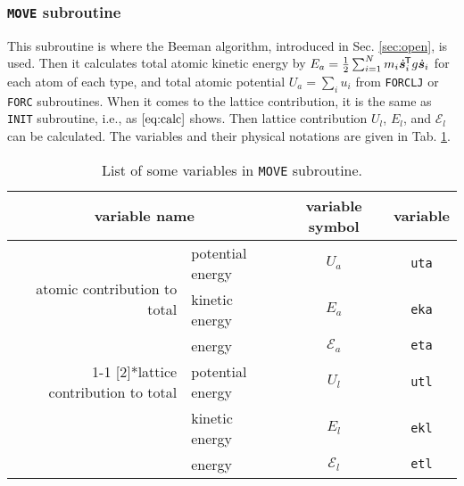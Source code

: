 
\subsubsection{\texttt{MOVE} subroutine}

This subroutine is where the Beeman algorithm, introduced in Sec. \ref{sec:open}, is used.
Then it calculates total atomic kinetic energy by
$E_a = \frac{ 1 }{ 2 } \sum_{i=1}^{N} m_i \dot{ \bm{s} }_i ^{\mkern-1.5mu\mathsf{T}}
g \dot{ \bm{s} }_i$ for each atom of each type,
and total atomic potential $U_a = \sum_{i} u_i$ from \texttt{FORCLJ} or \texttt{FORC}
subroutines.
When it comes to the lattice contribution, it is the same as \texttt{INIT} subroutine,
i.e., as $\eqref{eq:calc}$ shows. Then lattice contribution $U_l$, $E_l$, and
$\mathscr{E}_l$ can be calculated. The variables and their physical notations are given in 
Tab. \ref{tab:move}.

\begin{table}[h]
	\centering
	\caption{List of some variables in \texttt{MOVE} subroutine.}
	\begin{tabular}{@{}rlcc@{}}
		\toprule
		\multicolumn{2}{c}{variable name} & variable symbol & variable \\
		\midrule
		\multirow{3}[2]{*}{atomic contribution to total}                                  & potential energy & $U_a$           & \texttt{uta} \\
		                                                                                  & kinetic energy   & $E_a$           & \texttt{eka} \\
		                                                                                  & energy           & $\mathscr{E}_a$ & \texttt{eta} \\
		\cmidrule{1-1}\cmidrule{4-4}    \multirow{3}[2]{*}{lattice contribution to total} & potential energy & $U_l$           & \texttt{utl} \\
		                                                                                  & kinetic energy   & $E_l$           & \texttt{ekl} \\
		                                                                                  & energy           & $\mathscr{E}_l$ & \texttt{etl} \\
		\bottomrule
	\end{tabular}
	\label{tab:move}%
\end{table}%
